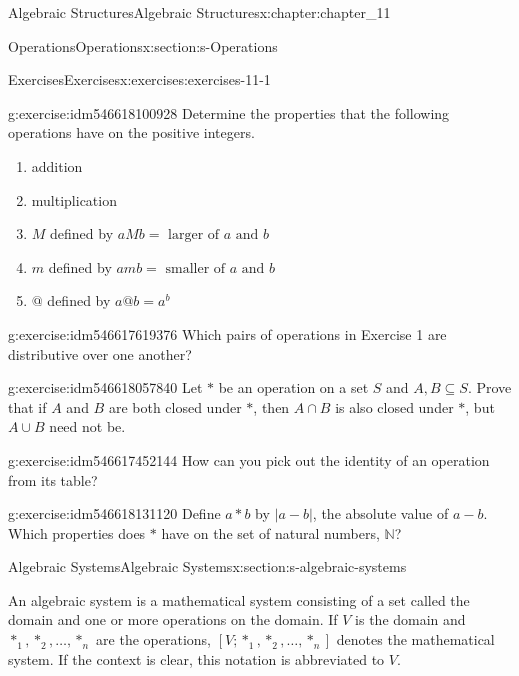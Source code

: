 \documentclass[oneside,10pt,]{book}
\numberwithin{equation}{section}
\begin{document}
\begin{chapterptx}{Algebraic Structures}{}{Algebraic Structures}{}{}{x:chapter:chapter_11}
\begin{sectionptx}{Operations}{}{Operations}{}{}{x:section:s-Operations}
\begin{exercises-subsection}{Exercises}{}{Exercises}{}{}{x:exercises:exercises-11-1}
\begin{divisionexercise}{1}{}{}{g:exercise:idm546618100928}%
Determine the properties that the following operations have on the positive integers.%
\begin{enumerate}[label=(\alph*)]
\item{}addition%
\item{}multiplication%
\item{}\(M\) defined by \(a M b = \textrm{ larger} \textrm{ of } a \textrm{ and } b\)%
\item{}\(m\) defined by \(a m b = \textrm{ smaller} \textrm{ of } a \textrm{ and } b\)%
\item{}\(@\) defined by \(a @ b = a^b\)%
\end{enumerate}
%
\end{divisionexercise}%
\begin{divisionexercise}{2}{}{}{g:exercise:idm546617619376}%
Which pairs of operations in Exercise 1 are distributive over one another?%
\end{divisionexercise}%
\begin{divisionexercise}{3}{}{}{g:exercise:idm546618057840}%
Let \(*\) be an operation on a set \(S\) and \(A, B \subseteq S\). Prove that if \(A\) and \(B\) are both closed under \(*\), then \(A\cap B\) is also closed under \(*\), but \(A \cup  B\) need not be.%
\end{divisionexercise}%
\begin{divisionexercise}{4}{}{}{g:exercise:idm546617452144}%
How can you pick out the identity of an operation from its table?%
\end{divisionexercise}%
\begin{divisionexercise}{5}{}{}{g:exercise:idm546618131120}%
Define \(a * b\) by \(\lvert a - b \rvert\), the absolute value of \(a - b\). Which properties does \(*\) have on the set of natural numbers, \(\mathbb{N}\)?%
\end{divisionexercise}%
\end{exercises-subsection}
\end{sectionptx}
%
%
\typeout{************************************************}
\typeout{************************************************}
%
\begin{sectionptx}{Algebraic Systems}{}{Algebraic Systems}{}{}{x:section:s-algebraic-systems}
%
\begin{introduction}{}%
An algebraic system is a mathematical system consisting of a set called the domain and one or more operations on the domain. If \(V\) is the domain and \(*_1, *_2, \ldots , *_n\) are the operations, \(\left[V;*_1, *_2, \ldots , *_n\right]\) denotes the mathematical system. If the context is clear, this notation is abbreviated to \(V\).%

\end{introduction}
\end{sectionptx}
\end{chapterptx}
\end{document}

